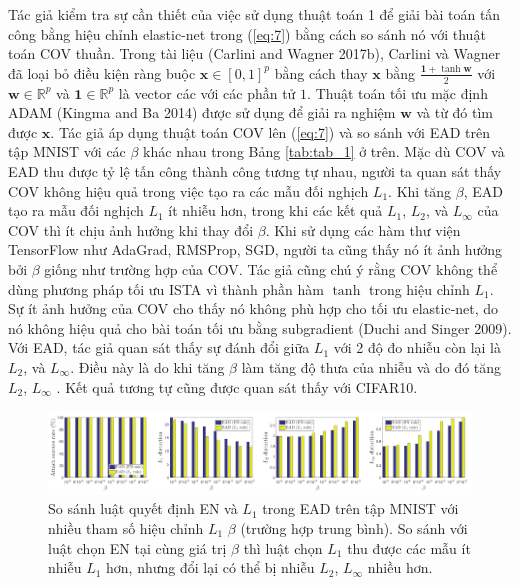 Tác giả kiểm tra sự cần thiết của việc sử dụng thuật toán 1 để giải bài toán tấn công bằng hiệu chỉnh elastic-net trong (\ref{eq:7}) bằng cách so sánh nó với thuật toán COV thuần. Trong tài liệu (Carlini and Wagner 2017b), Carlini và Wagner đã loại bỏ điều kiện ràng buộc $\mathbf{x} \in [0,1]^p$ bằng cách thay $\mathbf{x}$ bằng $\frac{\mathbf{1} + \tanh \mathbf{w}}{2}$ với $\mathbf{w} \in \mathbb{R}^p$ và $\mathbf{1} \in \mathbb{R}^p$ là vector các với các phần tử $1$. Thuật toán tối ưu mặc định ADAM (Kingma and Ba 2014) được sử dụng để giải ra nghiệm $\mathbf{w}$ và từ đó tìm được $\mathbf{x}$. Tác giả áp dụng thuật toán COV lên (\ref{eq:7}) và so sánh với EAD trên tập MNIST với các $\beta$ khác nhau trong Bảng \ref{tab:tab_1} ở trên. Mặc dù COV và EAD thu được tỷ lệ tấn công thành công tương tự nhau, người ta quan sát thấy COV không hiệu quả trong việc tạo ra các mẫu đối nghịch $L_1$. Khi tăng $\beta$, EAD tạo ra mẫu đối nghịch $L_1$ ít nhiễu hơn, trong khi các kết quả $L_1$, $L_2$, và $L_{\infty}$ của COV thì ít chịu ảnh hưởng khi thay đổi $\beta$. Khi sử dụng các hàm thư viện TensorFlow như AdaGrad, RMSProp, SGD, người ta cũng thấy nó ít ảnh hưởng bởi $\beta$ giống như trường hợp của COV. Tác giả cũng chú ý rằng COV không thể dùng phương pháp tối ưu ISTA vì thành phần hàm $\tanh$ trong hiệu chỉnh $L_1$. Sự ít ảnh hưởng của COV cho thấy nó không phù hợp cho tối ưu elastic-net, do nó không hiệu quả cho bài toán tối ưu bằng subgradient (Duchi and Singer 2009). Với EAD, tác giả quan sát thấy sự đánh đổi giữa $L_1$ với 2 độ đo nhiễu còn lại là $L_2$, và $L_{\infty}$. Điều này là do khi tăng $\beta$ làm tăng độ thưa của nhiễu và do đó tăng $L_2$, $L_{\infty}$ . Kết quả tương tự cũng được quan sát thấy với CIFAR10.
\begin{figure}[H] %
    \centering %
    \includegraphics[width=1\textwidth]{assets/fig_02.png} 
    \caption{So sánh luật quyết định EN và $L_1$ trong EAD trên tập MNIST với nhiều tham số hiệu chỉnh $L_1$ $\beta$ (trường hợp trung bình). So sánh với luật chọn EN tại cùng giá trị $\beta$ thì luật chọn $L_1$ thu được các mẫu ít nhiễu $L_1$ hơn, nhưng đổi lại có thể bị nhiễu $L_2$, $L_{\infty}$ nhiều hơn.}%
    \label{fig:fg_02}
\end{figure}


